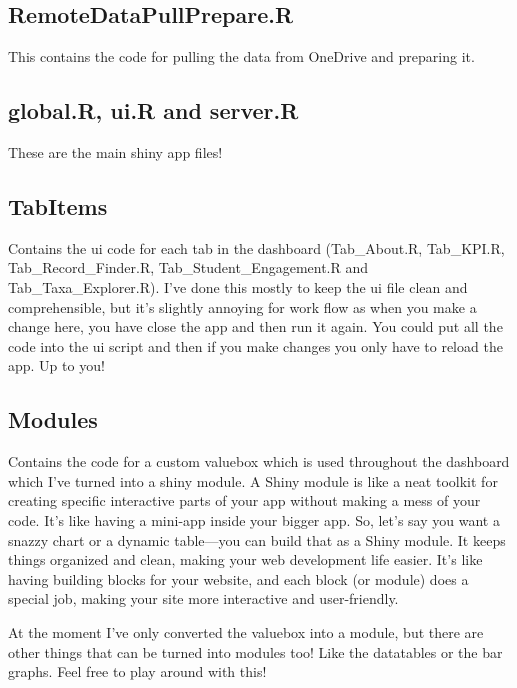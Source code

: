 \documentclass[
]{book}
\theoremstyle{definition}
\theoremstyle{definition}
\theoremstyle{definition}
\theoremstyle{definition}
\theoremstyle{remark}
\begin{document}
\hypertarget{remotedatapullprepare.r}{%
\subsection{RemoteDataPullPrepare.R}\label{remotedatapullprepare.r}}

This contains the code for pulling the data from OneDrive and preparing it.

\hypertarget{global.r-ui.r-and-server.r}{%
\subsection{global.R, ui.R and server.R}\label{global.r-ui.r-and-server.r}}

These are the main shiny app files!

\hypertarget{tabitems}{%
\subsection{TabItems}\label{tabitems}}

Contains the ui code for each tab in the dashboard (Tab\_About.R, Tab\_KPI.R, Tab\_Record\_Finder.R, Tab\_Student\_Engagement.R and Tab\_Taxa\_Explorer.R). I've done this mostly to keep the ui file clean and comprehensible, but it's slightly annoying for work flow as when you make a change here, you have close the app and then run it again. You could put all the code into the ui script and then if you make changes you only have to reload the app. Up to you!

\hypertarget{modules}{%
\subsection{Modules}\label{modules}}

Contains the code for a custom valuebox which is used throughout the dashboard which I've turned into a shiny module. A Shiny module is like a neat toolkit for creating specific interactive parts of your app without making a mess of your code. It's like having a mini-app inside your bigger app. So, let's say you want a snazzy chart or a dynamic table---you can build that as a Shiny module. It keeps things organized and clean, making your web development life easier. It's like having building blocks for your website, and each block (or module) does a special job, making your site more interactive and user-friendly.

At the moment I've only converted the valuebox into a module, but there are other things that can be turned into modules too! Like the datatables or the bar graphs. Feel free to play around with this!
\end{document}
